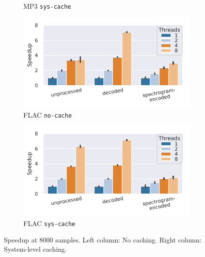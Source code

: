 {\begin{figure}
\begin{subfigure}[c]{0.22\textwidth}
        \vspace{-18pt}
        \caption{MP3 \texttt{sys-cache}}
        \label{fig:speedup-epochs-mp3}
    \end{subfigure}
    \begin{subfigure}[c]{0.22\textwidth}
        \includegraphics[width=\textwidth]{figures/librispeech-pipeline/speedup-8000-samples-epoch-0.pdf}
        \vspace{-18pt}
        \caption{FLAC \texttt{no-cache}}
        \label{fig:speedup-flac}
    \end{subfigure}
    \begin{subfigure}[c]{0.22\textwidth}
        \includegraphics[width=\textwidth]{figures/librispeech-pipeline/speedup-8000-samples-epoch-1.pdf}
        \vspace{-18pt}
        \caption{FLAC \texttt{sys-cache}}
        \label{fig:speedup-epochs-flac}
    \end{subfigure}
    \vspace{-0.3cm}
    \caption{{\color{diff}Speedup at 8000 samples. Left column: No caching. Right column: System-level caching.}}
    \label{fig:speedup}
\end{figure}


}
